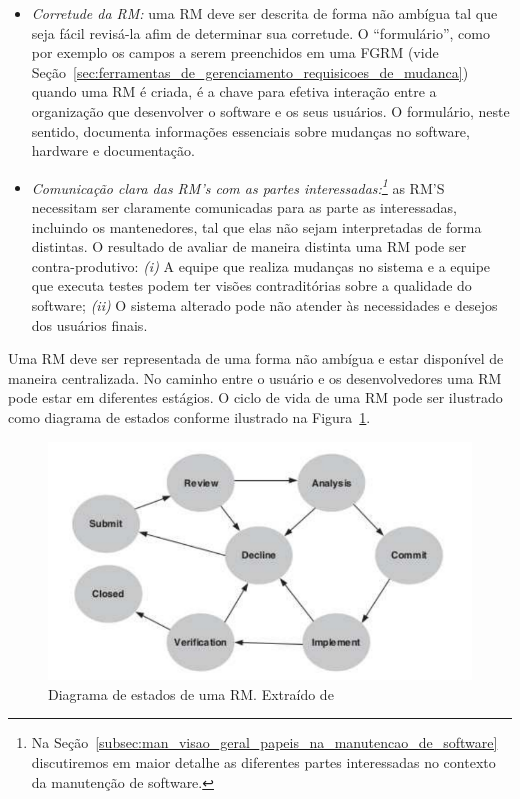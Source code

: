 \begin{itemize}
	\item \textit{Corretude da RM:} uma RM deve ser descrita de forma não ambígua tal
		que seja fácil revisá-la afim de determinar sua corretude. O
		``formulário'', como por exemplo os campos a serem preenchidos em uma
		FGRM (vide
		Seção~\ref{sec:ferramentas_de_gerenciamento_requisicoes_de_mudanca})
		quando uma RM é criada, é a chave para efetiva interação entre a
		organização que desenvolver o software e os seus usuários. O formulário,
		neste sentido, documenta informações essenciais sobre mudanças no
		software, hardware e documentação.
   \item \textit{Comunicação clara das RM's com as partes
		   interessadas:\footnote{Na
			   Seção~\ref{subsec:man_visao_geral_papeis_na_manutencao_de_software}
			   discutiremos em maior detalhe as diferentes partes interessadas
			   no contexto da manutenção de software.}} as RM'S necessitam ser
	   claramente comunicadas para as parte as interessadas, incluindo os
	   mantenedores, tal que elas não sejam interpretadas de forma distintas. O
	   resultado de avaliar de maneira distinta uma RM pode ser contra-produtivo:
	   \textit{(i)} A equipe que realiza mudanças no sistema e a equipe que
	   executa testes podem ter  visões contraditórias sobre a qualidade do
	   software; \textit{(ii)} O sistema alterado pode não atender às
	   necessidades e desejos dos usuários finais.
\end{itemize}

Uma RM deve ser representada de uma forma não ambígua e estar disponível de
maneira centralizada. No caminho entre o usuário e os desenvolvedores uma RM
pode estar em diferentes estágios. O ciclo de vida de uma RM pode ser ilustrado
como diagrama de estados conforme ilustrado na
Figura~\ref{fig:diagrama-estado-rm}.

\begin{figure}[htpb]
	\centering
	\includegraphics[width=0.8\linewidth]{./chapter-manutencao-software-visao-geral/img/diagrama-estado-rm.pdf}
	\caption{Diagrama de estados de uma RM\@. Extraído
		de~\cite{tripathy2014software}}
\label{fig:diagrama-estado-rm}
\end{figure}

